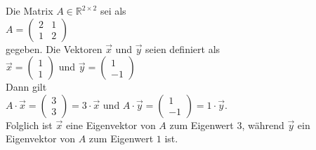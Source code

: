 \example
Die Matrix $A \in \mathbb{R}^{2 \times 2}$ sei als
\\[0.2cm]
\hspace*{1.3cm}
$A = \left(
  \begin{array}{ll}
    2 & 1 \\
    1 & 2
  \end{array}
  \right)
$
\\[0.2cm]
gegeben.  Die Vektoren $\vec{x}$ und $\vec{y}$ seien definiert als
\\[0.2cm]
\hspace*{1.3cm}
$\vec{x} = \left(
\begin{array}{r}
  1 \\
  1    
\end{array}\right)
$ \quad und \quad 
$\vec{y} = \left(
\begin{array}{r}
  1 \\
  -1    
\end{array}
\right)
$
\\[0.2cm]
Dann gilt 
\\[0.2cm]
\hspace*{1.3cm}
$A \cdot \vec{x} = \left(
\begin{array}{r}
  3 \\
  3    
\end{array}\right) = 3 \cdot \vec{x}$ \quad und \quad
$A \cdot \vec{y} = \left(
\begin{array}{r}
  1 \\
  -1    
\end{array}\right) = 1 \cdot \vec{y}$.
\\[0.2cm]
Folglich ist $\vec{x}$ eine Eigenvektor von $A$ zum Eigenwert $3$, w\"ahrend $\vec{y}$ ein
Eigenvektor von $A$ zum Eigenwert $1$ ist.  \eox

